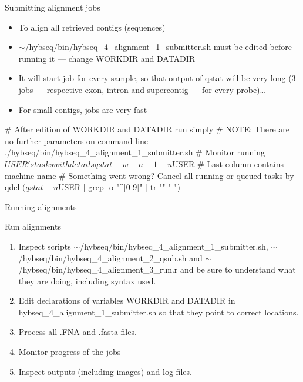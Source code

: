 \documentclass[compress, ucs, xelatex, 11pt, xcolor=x11names, aspectratio=169,
	hyperref={
		bookmarks=true,
		unicode=true,
		colorlinks=true,
		pdftitle={HybSeq course},
		plainpages=false,
		pdfauthor={Vojtech Zeisek},
		pdfsubject={Practical processing of HybSeq target enrichment sequencing data on computing grids like MetaCentrum},
		pdfcreator={XeLaTeX},
		pdfkeywords={BASH, command line, GNU, HybSeq, Linux, MetaCentrum, sequencing shell, target enrichment},
		linkcolor=Turquoise4, %
		anchorcolor=DodgerBlue4, %
		citecolor=DodgerBlue4, %
		filecolor=DodgerBlue4, %
		menucolor=Tan4, %
		urlcolor=DarkOliveGreen4, %
		pdftex},
	url={hyphens, lowtilde} %
	]{beamer}
\renewcommand{\texttt}[1]{\colorbox{Cornsilk2}{{\ttfamily #1}}}
\renewcommand{\alert}[1]{\textcolor{OrangeRed3}{#1}}
\begin{document}
\begin{frame}[fragile]{Submitting alignment jobs}
	\begin{itemize}
		\item To align all retrieved contigs (sequences)
		\item \alert{\texttt{$\sim$/hybseq/bin/hybseq\_4\_alignment\_1\_submitter.sh} must be edited before running it --- change \texttt{WORKDIR} and \texttt{DATADIR}}
		\item It will start job for every sample, so that output of \texttt{qstat} will be very long (3 jobs --- respective exon, intron and supercontig --- for every probe)\ldots
		\item For small contigs, jobs are very fast
	\end{itemize}
	\begin{bashcode}
    # After edition of WORKDIR and DATADIR run simply
    # NOTE: There are no further parameters on command line
    ./hybseq/bin/hybseq_4_alignment_1_submitter.sh
    # Monitor running $USER's tasks with details
    qstat -w -n -1 -u $USER # Last column contains machine name
    # Something went wrong? Cancel all running or queued tasks by
    qdel $(qstat -u $USER | grep -o "^[0-9]\+" | tr "\n" " ")
	\end{bashcode}
\end{frame}

\begin{frame}{Running alignments}
	\begin{exampleblock}{Run alignments}
		\begin{enumerate}
			\item Inspect scripts \texttt{$\sim$/hybseq/bin/hybseq\_4\_alignment\_1\_submitter.sh}, \texttt{$\sim$/hybseq/bin/hybseq\_4\_alignment\_2\_qsub.sh} and \texttt{$\sim$/hybseq/bin/hybseq\_4\_alignment\_3\_run.r} and be sure to understand what they are doing, including syntax used.
			\item Edit declarations of variables \texttt{WORKDIR} and \texttt{DATADIR} in \texttt{hybseq\_4\_alignment\_1\_submitter.sh} so that they point to correct locations.
			\item Process all \texttt{*.FNA} and \texttt{*.fasta} files.
			\item Monitor progress of the jobs
			\item Inspect outputs (including images) and log files.
		\end{enumerate}
	\end{exampleblock}
\end{frame}
\end{document}
